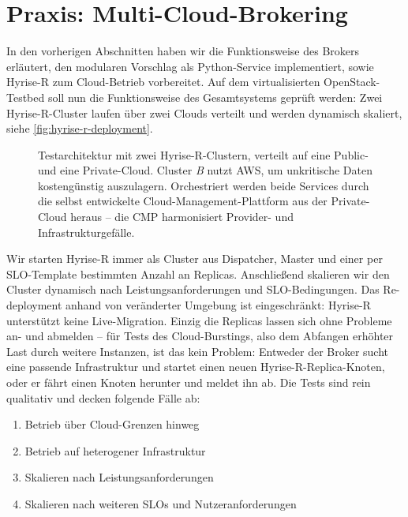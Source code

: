 \section{Praxis: Multi-Cloud-Brokering}

In den vorherigen Abschnitten haben wir die Funktionsweise des Brokers erläutert, den modularen Vorschlag als Python-Service implementiert, sowie Hyrise-R zum Cloud-Betrieb vorbereitet. Auf dem virtualisierten OpenStack-Testbed soll nun die Funktionsweise des Gesamtsystems geprüft werden: Zwei Hyrise-R-Cluster laufen über zwei Clouds verteilt und werden dynamisch skaliert, siehe \autoref{fig:hyrise-r-deployment}.

\begin{figure}[ht]
	\centering
	\def\svgwidth{0.85\textwidth}
	{\footnotesize \textsf{
			}}
	\caption{Testarchitektur mit zwei Hyrise-R-Clustern, verteilt auf eine Public- und eine Private-Cloud. Cluster \emph{B} nutzt AWS, um unkritische Daten kostengünstig auszulagern. Orchestriert werden beide Services durch die selbst entwickelte Cloud-Management-Plattform aus der Private-Cloud heraus -- die CMP harmonisiert Provider- und Infrastrukturgefälle.}	
	\label{fig:hyrise-r-deployment}
\end{figure}

Wir starten Hyrise-R immer als Cluster aus Dispatcher, Master und einer per SLO-Template bestimmten Anzahl an Replicas. Anschließend skalieren wir den Cluster dynamisch nach Leistungsanforderungen und SLO-Bedingungen. Das Re-deployment anhand von veränderter Umgebung ist eingeschränkt: Hyrise-R unterstützt keine Live-Migration. Einzig die Replicas lassen sich ohne Probleme an- und abmelden -- für Tests des Cloud-Burstings, also dem Abfangen erhöhter Last durch weitere Instanzen, ist das kein Problem: Entweder der Broker sucht eine passende Infrastruktur und startet einen neuen Hyrise-R-Replica-Knoten, oder er fährt einen Knoten herunter und meldet ihn ab. Die Tests sind rein qualitativ und decken folgende Fälle ab:

\begin{enumerate}
	\item Betrieb über Cloud-Grenzen hinweg
	\item Betrieb auf heterogener Infrastruktur
	\item Skalieren nach Leistungsanforderungen
	\item Skalieren nach weiteren SLOs und Nutzeranforderungen
\end{enumerate}

